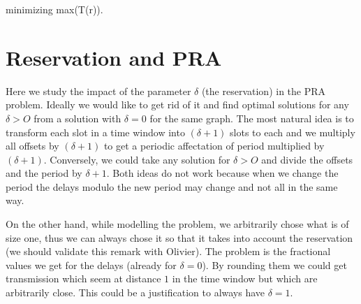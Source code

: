 \documentclass{article}
\begin{document}
 minimizing max(T(r)).\\



\section{Reservation and PRA}


Here we study the impact of the parameter $\delta$ (the reservation) in the PRA problem. 
Ideally we would like to get rid of it and find optimal solutions for any $\delta>O$
from a solution with $\delta = 0$ for the same graph. 
The most natural idea is to transform each slot in a time window into $(\delta+1)$ slots to each and we multiply all offsets by $(\delta+1)$ 
to get a periodic affectation of period multiplied by $(\delta+1)$. Conversely, we could take any solution for $\delta>O$ and divide the offsets and the period by 
$\delta +1$. Both ideas do not work because when we change the period the delays modulo the new period may change and not all in the same way.



On the other hand, while modelling the problem, we arbitrarily chose what is of size one, thus we can always 
chose it so that it takes into account the reservation (we should validate this remark with Olivier). The problem is the 
fractional values we get for the delays (already for $\delta =0$). By rounding them we could get transmission which seem at distance $1$ 
in the time window but which are arbitrarily close. This could be a justification to always have $\delta =1$.  



% 




\end{document}

